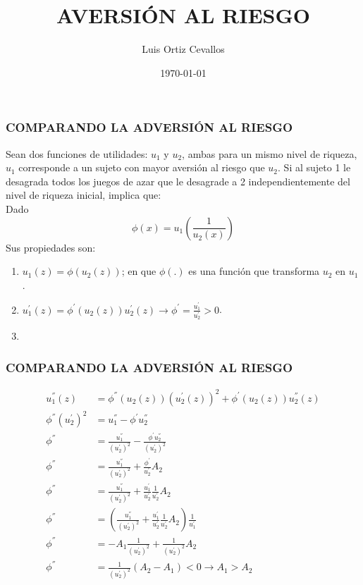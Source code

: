 \documentclass[10pt, xcolor=table, x11names]{beamer}
\title[AVERSIÓN AL RIESGO]{AVERSIÓN AL RIESGO}
\author[Luis Ortiz]{Luis Ortiz Cevallos}
\institute[U]{\bf UNIVERSIDAD}
\date[\today]{\footnotesize \today}
\begin{document}
\begin{frame}
\titlepage
\end{frame}


\begin{frame}[label=1]
	\frametitle{{\normalsize COMPARANDO LA ADVERSIÓN AL RIESGO} {}}

Sean dos funciones de utilidades: $u_{1}$ y	$u_{2}$, ambas para un mismo nivel de riqueza,  $u_{1}$ corresponde a un sujeto con mayor aversión al riesgo que $u_{2}$. Si al sujeto 1 le desagrada todos los juegos de azar que le desagrade a 2 independientemente del nivel de riqueza inicial, implica que:\\
Dado \begin{equation}
\phi (x)=u_{1}(\frac{1}{u_{2}(x)})
\end{equation}
Sus propiedades son:
\begin{enumerate}
	\item $u_{1}(z)=\phi(u_{2}(z))$; en que $\phi(.) $ es una función que transforma $u_{2}$ en $u_{1}$.
	\item $u_{1}^{'}(z)=\phi^{'}(u_{2}(z))u_{2}^{'}(z)\rightarrow \phi^{'}=\frac{u_{1}^{'}}{u_{2}^{'}}>0$.
	\item
\end{enumerate}


\end{frame}


\begin{frame}[label=2]
	\frametitle{{\normalsize COMPARANDO LA ADVERSIÓN AL RIESGO} {}}
	
	\begin{align}
	u_{1}^{''}(z)&=\phi^{''}(u_{2}(z))(u_{2}^{'}(z))^{2}+\phi^{'}(u_{2}(z))u_{2}^{''}(z)\nonumber \\
	\phi^{''}(u_{2}^{'})^{2}&=u_{1}^{''}-\phi^{'}u_{2}^{''}\nonumber \\
	\phi^{''}&=\frac{u_{1}^{''}}{(u_{2}^{'})^{2}}-\frac{\phi^{'}u_{2}^{''}}{(u_{2}^{'})^{2}}\nonumber \\
	\phi^{''}&=\frac{u_{1}^{''}}{(u_{2}^{'})^{2}}+\frac{\phi^{'}}{u_{2}^{'}}A_{2}\nonumber \\
	\phi^{''}&=\frac{u_{1}^{''}}{(u_{2}^{'})^{2}}+\frac{u_{1}^{'}}{u_{2}^{'}}\frac{1}{u_{2}^{'}}A_{2}\nonumber \\
	\phi^{''}&=(\frac{u_{1}^{''}}{(u_{2}^{'})^{2}}+\frac{u_{1}^{'}}{u_{2}^{'}}\frac{1}{u_{2}^{'}}A_{2})\frac{1}{u_{1}^{'}}\nonumber\\
	\phi^{''}&=-A_{1}\frac{1}{(u_{2}^{'})^{2}}+\frac{1}{(u_{2}^{'})^{2}}A_{2}\nonumber  \\
	\phi^{''}&=\frac{1}{(u_{2}^{'})^{2}}(A_{2}-A_{1})<0\rightarrow A_{1}>A_{2} \nonumber  
	\end{align}
	
	
\end{frame}
\end{document}
